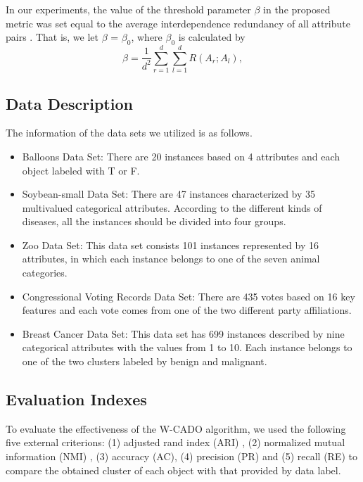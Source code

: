 \documentclass[review]{elsarticle}
\begin{document}
In our experiments, the value of the threshold parameter $\beta$ in the proposed metric was set equal to the average interdependence redundancy of all attribute pairs \cite{JiaH2016NewMetric}. That is, we let $\beta$ = $\beta_0$, where $\beta_0$ is calculated by
\begin{equation}
\beta = \frac{1}{d^2}\sum_{r=1}^{d}\sum_{l=1}^{d}R(A_r;A_l),
\label{equ21}
\end{equation}

\subsection{Data Description}
The information of the data sets we utilized is as follows.
\begin{itemize}
  \item Balloons Data Set: There are 20 instances based on 4 attributes and each object labeled with T or F.
  \item Soybean-small Data Set: There are 47 instances characterized by 35 multivalued categorical attributes. According to the different kinds of diseases, all the instances should be divided into four groups.
  \item Zoo Data Set: This data set consists 101 instances represented by 16 attributes, in which each instance belongs to one of the seven animal categories.
  \item Congressional Voting Records Data Set: There are 435 votes based on 16 key features and each vote comes from one of the two different party affiliations.
  \item Breast Cancer Data Set: This data set has 699 instances described by nine categorical attributes with the values from 1 to 10. Each instance belongs to one of the two clusters labeled by benign and malignant.
\end{itemize}

\subsection{Evaluation Indexes}
To evaluate the effectiveness of the W-CADO algorithm, we used the following five external criterions: (1) adjusted rand index (ARI) \cite{LiangJY2012means}, (2) normalized mutual information (NMI) \cite{strehl2003cluster}, (3) accuracy (AC), (4) precision (PR) and (5) recall (RE) to compare the obtained cluster of each object with that provided by data label.
\end{document}

